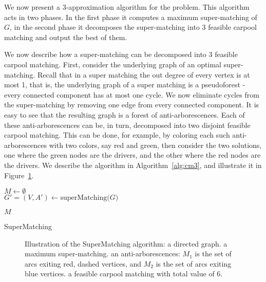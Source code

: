 \label{sec:cm}
We now present a 3-approximation algorithm for the \textsc{\CARPOOL{}} problem.
This algorithm acts in two phases.
In the first phase it computes a maximum super-matching of $G$, 
in the second phase it decomposes the super-matching into 3 feasible
carpool matching and output the best of them.

We now describe how a super-matching can be decomposed into 3 feasible carpool
matching.
First, consider the underlying graph of an optimal super-matching.
Recall that in a super matching the out degree of every vertex is at most 1,
that is, the underlying graph of a super matching is a pseudoforest - every
connected component has at most one cycle.
We now eliminate cycles from the super-matching by removing one edge from every
connected component.
It is easy to see that the resulting graph is a forest of anti-arborescences.
Each of these anti-arborescences can be, in turn, decomposed into two disjoint
feasible carpool matching.
This can be done, for example, by coloring each such anti-arborescences with two
colors, say red and green, then consider the two solutions, one where the green
nodes are the drivers, and the other where the red nodes are the drivers.
We describe the algorithm in Algorithm~\ref{alg:cm3}, 
and illustrate it in Figure~\ref{fig:spanning-bipartite-graph}.   

\begin{algorithm}[t]

$M \leftarrow \emptyset$								\\
$G' = (V, A') \leftarrow \text{superMatching($G$)}$				\\


\Return $M$
\caption{
\label{alg:cm3}
SuperMatching}
\end{algorithm}

\begin{figure}
\centering

\caption[]{
\label{fig:spanning-bipartite-graph}
Illustration of the SuperMatching algorithm:
 a directed graph. 
 a maximum super-matching.  
 an anti-arborescences:
$M_1$ is the set of arcs exiting red, dashed vertices, 
and $M_2$ is the set of arcs exiting blue vertices.
 a feasible carpool matching with total value of 6.   
}
\end{figure}

